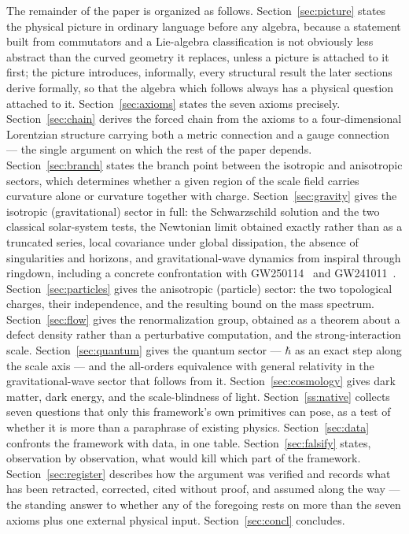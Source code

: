 \documentclass[pdflatex,sn-mathphys-num]{sn-jnl}
\theoremstyle{thmstyleone}
\theoremstyle{thmstylethree}
\theoremstyle{thmstyletwo}
\begin{document}
The remainder of the paper is organized as follows. Section~\ref{sec:picture}
states the physical picture in ordinary language before any algebra,
because a statement built from commutators and a Lie-algebra
classification is not obviously less abstract than the curved geometry
it replaces, unless a picture is attached to it first; the picture
introduces, informally, every structural result the later sections
derive formally, so that the algebra which follows always has a physical
question attached to it. Section~\ref{sec:axioms} states the seven
axioms precisely. Section~\ref{sec:chain} derives the forced chain from
the axioms to a four-dimensional Lorentzian structure carrying both a
metric connection and a gauge connection — the single argument on which
the rest of the paper depends. Section~\ref{sec:branch} states the
branch point between the isotropic and anisotropic sectors, which
determines whether a given region of the scale field carries curvature
alone or curvature together with charge. Section~\ref{sec:gravity} gives
the isotropic (gravitational) sector in full: the Schwarzschild solution
and the two classical solar-system tests, the Newtonian limit obtained
exactly rather than as a truncated series, local covariance under global
dissipation, the absence of singularities and horizons, and
gravitational-wave dynamics from inspiral through ringdown, including a
concrete confrontation with GW250114~\cite{GW250114} and
GW241011~\cite{GW241011}.
Section~\ref{sec:particles} gives the anisotropic (particle) sector: the
two topological charges, their independence, and the resulting bound on
the mass spectrum. Section~\ref{sec:flow} gives the renormalization
group, obtained as a theorem about a defect density rather than a
perturbative computation, and the strong-interaction scale.
Section~\ref{sec:quantum} gives the quantum sector — $\hbar$ as an exact
step along the scale axis — and the all-orders equivalence with general
relativity in the gravitational-wave sector that follows from it.
Section~\ref{sec:cosmology} gives dark matter, dark energy, and the
scale-blindness of light. Section~\ref{ss:native} collects seven
questions that only this framework's own primitives can pose, as a test
of whether it is more than a paraphrase of existing physics.
Section~\ref{sec:data} confronts the framework
with data, in one table. Section~\ref{sec:falsify} states, observation by
observation, what would kill which part of the framework.
Section~\ref{sec:register} describes how the argument was verified and
records what has been retracted, corrected, cited without proof, and
assumed along the way — the standing answer to whether any of the
foregoing rests on more than the seven axioms plus one external physical
input. Section~\ref{sec:concl} concludes.
\end{document}
